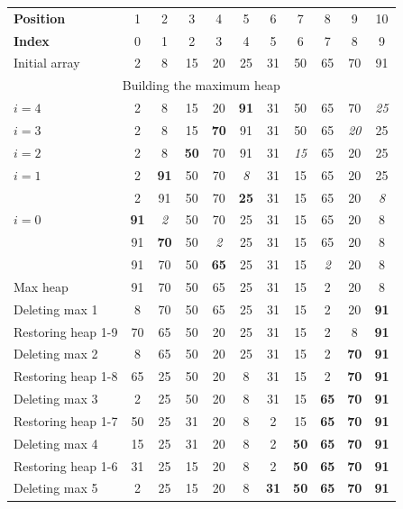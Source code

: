 {}%
\begin{center}
{\footnotesize
\begin{tabular}{|l|c|c|c|c|c|c|c|c|c|c|}
\hline
\textbf{Position}& 1& 2& 3& 4& 5& 6& 7& 8& 9& 10 \\
\textbf{Index}& 0& 1& 2& 3& 4& 5& 6& 7& 8& 9 \\
\hline
Initial array& 2& 8& 15& 20& 25& 31& 50& 65& 70& 91 \\
\hline
\multicolumn{11}{|c|}{Building the maximum heap}\\
$i=4$& 2& 8& 15& 20& \textbf{91}& 31& 50& 65& 70& \textit{25} \\
$i=3$& 2& 8& 15& \textbf{70}& 91& 31& 50& 65& \textit{20}& 25 \\
$i=2$& 2& 8& \textbf{50}& 70& 91& 31& \textit{15}& 65& 20& 25 \\
$i=1$& 2& \textbf{91}& 50& 70& \textit{8}& 31& 15& 65& 20& 25 \\
     & 2& 91& 50& 70& \textbf{25}& 31& 15& 65& 20& \textit{8} \\
$i=0$ & \textbf{91}& \textit{2}& 50& 70& 25& 31& 15& 65& 20& 8 \\
      & 91& \textbf{70}& 50& \textit{2}& 25& 31& 15& 65& 20& 8 \\
      & 91& 70& 50& \textbf{65}& 25& 31& 15& \textit{2}& 20& 8 \\
\hline
Max heap& 91& 70& 50& 65& 25& 31& 15& 2& 20& 8 \\
\hline
Deleting max 1& 8& 70& 50& 65& 25& 31& 15& 2& 20& \textbf{91} \\
Restoring heap 1-9& 70& 65& 50& 20& 25& 31& 15& 2& 8& \textbf{91} \\
\hline
Deleting max 2& 8& 65& 50& 20& 25& 31& 15& 2& \textbf{70}& \textbf{91} \\
Restoring heap 1-8& 65& 25& 50& 20& 8& 31& 15& 2& \textbf{70}& \textbf{91} \\
\hline
Deleting max 3& 2& 25& 50& 20& 8& 31& 15& \textbf{65}& \textbf{70}& \textbf{91} \\
Restoring heap 1-7& 50& 25& 31& 20& 8& 2& 15& \textbf{65}& \textbf{70}& \textbf{91} \\
\hline
Deleting max 4& 15& 25& 31& 20& 8& 2& \textbf{50}& \textbf{65}& \textbf{70}& \textbf{91} \\
Restoring heap 1-6& 31& 25& 15& 20& 8& 2& \textbf{50}& \textbf{65}& \textbf{70}& \textbf{91} \\
\hline
Deleting max 5& 2& 25& 15& 20& 8& \textbf{31}& \textbf{50}& \textbf{65}& \textbf{70}& \textbf{91} \\

\end{tabular}}
\end{center}
